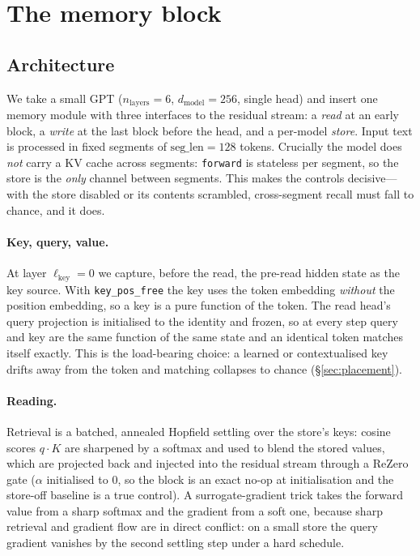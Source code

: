 \section{The memory block}
\label{sec:method}

\subsection{Architecture}

We take a small GPT ($n_\text{layers}=6$, $d_\text{model}=256$, single head) and
insert one memory module with three interfaces to the residual stream: a
\emph{read} at an early block, a \emph{write} at the last block before the head,
and a per-model \emph{store}. Input text is processed in fixed segments of
$\text{seg\_len}=128$ tokens. Crucially the model does \emph{not} carry a KV cache
across segments: \texttt{forward} is stateless per segment, so the store is the
\emph{only} channel between segments. This makes the controls decisive---with the
store disabled or its contents scrambled, cross-segment recall must fall to
chance, and it does.

\paragraph{Key, query, value.} At layer $\ell_\text{key}=0$ we capture, before the
read, the pre-read hidden state as the key source. With \texttt{key\_pos\_free}
the key uses the token embedding \emph{without} the position embedding, so a key is
a pure function of the token. The read head's query projection is initialised to
the identity and frozen, so at every step query and key are the same function of
the same state and an identical token matches itself exactly. This is the
load-bearing choice: a learned or contextualised key drifts away from the token
and matching collapses to chance (\S\ref{sec:placement}).

\paragraph{Reading.} Retrieval is a batched, annealed Hopfield settling over the
store's keys: cosine scores $q\!\cdot\!K$ are sharpened by a softmax and used to
blend the stored values, which are projected back and injected into the residual
stream through a ReZero gate ($\alpha$ initialised to $0$, so the block is an
exact no-op at initialisation and the store-off baseline is a true control). A
surrogate-gradient trick takes the forward value from a sharp softmax and the
gradient from a soft one, because sharp retrieval and gradient flow are in direct
conflict: on a small store the query gradient vanishes by the second settling step
under a hard schedule.

